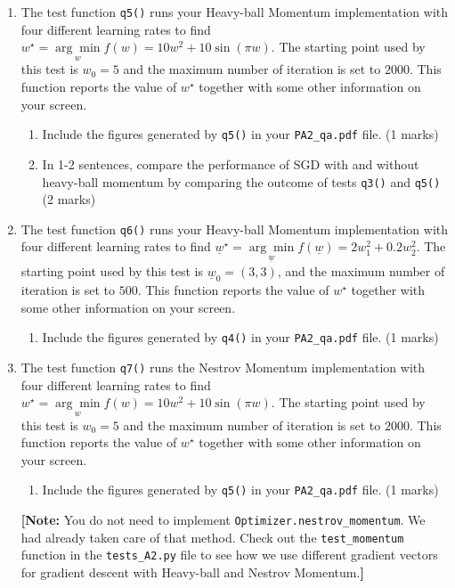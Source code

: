 \documentclass{article}
\theoremstyle{definition}
\begin{document}
\begin{enumerate}[label=\ref{mom}.\alph*]
	\item \label{ddd}The test function \verb|q5()| runs your Heavy-ball Momentum implementation with four different learning rates to find $w^\star = \underset{w}{\arg \min} f(w) = 10w^2 + 10\sin(\pi w)$. The starting point used by this test is $w_0=5$ and the maximum number of iteration is set to $2000$. This function reports the value of $w^\star$ together with some other information on your screen.
	\begin{enumerate}[label=\ref{ddd}.\roman*]
		\item Include the figures generated by \verb|q5()| in your \verb|PA2_qa.pdf| file. (1 marks)
		\item In 1-2 sentences, compare the performance of SGD with and without heavy-ball momentum by comparing the outcome of tests \verb|q3()| and \verb|q5()| (2 marks)
	\end{enumerate}
	\item \label{fff}The test function \verb|q6()| runs your Heavy-ball Momentum implementation with four different learning rates to find $\underline{w}^\star = \underset{\underline{w}}{\arg \min} f(\underline{w}) = 2w_1^2 + 0.2w_2^2$. The starting point used by this test is $\underline{w}_0=(3,3)$, and the maximum number of iteration is set to $500$. This function reports the value of $w^\star$ together with some other information on your screen.
	\begin{enumerate}[label=\ref{fff}.\roman*]
		\item Include the figures generated by \verb|q4()| in your \verb|PA2_qa.pdf| file. (1 marks)
	\end{enumerate}
	\item \label{ggg}The test function \verb|q7()| runs the Nestrov Momentum implementation with four different learning rates to find $w^\star = \underset{w}{\arg \min} f(w) = 10w^2 + 10\sin(\pi w)$. The starting point used by this test is $w_0=5$ and the maximum number of iteration is set to $2000$. This function reports the value of $w^\star$ together with some other information on your screen.
	\begin{enumerate}[label=\ref{ggg}.\roman*]
		\item Include the figures generated by \verb|q5()| in your \verb|PA2_qa.pdf| file. (1 marks)
	\end{enumerate}
	\textbf{[Note:} You do not need to implement \verb|Optimizer.nestrov_momentum|. We had already taken care of that method. Check out the \verb|test_momentum| function in the \verb|tests_A2.py| file to see how we use different gradient vectors for gradient descent with Heavy-ball and Nestrov Momentum.\textbf{]}

\end{enumerate}
\end{document}
